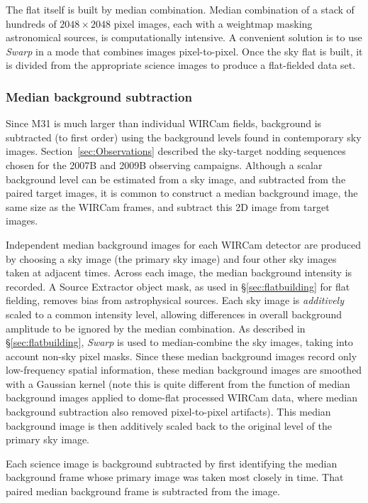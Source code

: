 \documentclass[iop]{emulateapj}
\newcommand{\sw}[1]{\textit{#1}} %
\newcommand{\Sec}[1]{\S\ref{sec:#1}}  %
\begin{document}
The flat itself is built by median combination.
Median combination of a stack of hundreds of $2048\times2048$ pixel images, each with a weightmap masking astronomical sources, is computationally intensive.
A convenient solution is to use \sw{Swarp} \citep[an image-mosaicing software package,][]{Bertin:2002} in a mode that combines images pixel-to-pixel.
Once the sky flat is built, it is divided from the appropriate science images to produce a flat-fielded data set.

\subsubsection{Median background subtraction}
\label{sec:mediansky}

Since M31 is much larger than individual WIRCam fields, background is subtracted (to first order) using the background levels found in contemporary sky images.
Section~\ref{sec:Observations} described the sky-target nodding sequences chosen for the 2007B and 2009B observing campaigns. 
Although a scalar background level can be estimated from a sky image, and subtracted from the paired target images, it is common to construct a median background image, the same size as the WIRCam frames, and subtract this 2D image from target images.

Independent median background images for each WIRCam detector are produced by choosing a sky image (the primary sky image) and four other sky images taken at adjacent times.
Across each image, the median background intensity is recorded.
A Source Extractor object mask, as used in \Sec{flatbuilding} for flat fielding, removes bias from astrophysical sources.
Each sky image is \emph{additively} scaled to a common intensity level, allowing differences in overall background amplitude to be ignored by the median combination.
As described in \Sec{flatbuilding}, \sw{Swarp} is used to median-combine the sky images, taking into account non-sky pixel masks.
Since these median background images record only low-frequency spatial information, these median background images are smoothed with a Gaussian kernel (note this is quite different from the function of median background images applied to dome-flat processed WIRCam data, where median background subtraction also removed pixel-to-pixel artifacts).
This median background image is then additively scaled back to the original level of the primary sky image.

Each science image is background subtracted by first identifying the median background frame whose primary image was taken most closely in time.
That paired median background frame is subtracted from the image.
\end{document}
